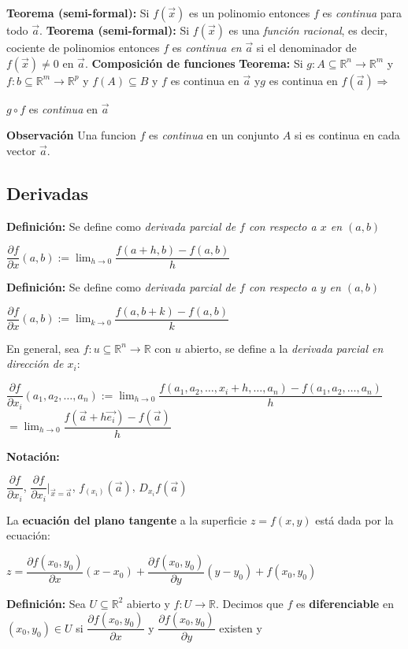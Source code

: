 \documentclass[12pt]{article}
\begin{document}
\noindent\textbf{Teorema (semi-formal):} Si $f(\vec{x})$ es un polinomio entonces $f$ es \emph{continua } para todo $\vec{a}$.\newline
\newline
\noindent\textbf{Teorema (semi-formal):} Si $f(\vec{x})$ es una \emph{función racional}, es decir, cociente de polinomios
entonces $f$ es \emph{continua en} $\vec{a}$ si el denominador de $f(\vec{x})\not=0$ en $\vec{a}$.\newline
\newline
\newpage
\textbf{Composición de funciones}\newline
\textbf{Teorema: }Si $g:A\subseteq\mathbb{R}^n\rightarrow \mathbb{R}^m$ y $f:b\subseteq\mathbb{R}^m\rightarrow \mathbb{R}^p$ y 
$f(A)\subseteq B$ y $f$ es continua en $\vec{a}$ y$g$ es continua en $f(\vec{a})\Longrightarrow$ 
\begin{center}
    $g\circ f$ es \emph{continua} en $\vec{a}$
\end{center}
\noindent \textbf{Observación} Una funcion $f$ es \emph{continua} en un conjunto $A$ si es continua en cada vector $\vec{a}$.
\newpage
\subsection*{Derivadas}
\noindent \textbf{Definición:} Se define como \emph{derivada parcial de $f$ con respecto a $x$ en $(a,b)$}
\begin{center}
    $\dfrac{\partial f}{\partial x}{(a,b)}:=\lim_{h\rightarrow0}{\dfrac{f(a+h,b)-f(a,b)}{h}}$
\end{center}
\noindent \textbf{Definición:} Se define como \emph{derivada parcial de $f$ con respecto a $y$ en $(a,b)$}
\begin{center}
    $\dfrac{\partial f}{\partial x}{(a,b)}:=\lim_{k\rightarrow0}{\dfrac{f(a,b+k)-f(a,b)}{k}}$
\end{center}
\noindent En general, sea $f:u\subseteq\mathbb{R}^n\rightarrow \mathbb{R}$ con $u$ abierto, 
se define a la \emph{derivada parcial en dirección de $x_i$}: 
\begin{center}
    $\dfrac{\partial f}{\partial x_i}{(a_1,a_2,\dots,a_n)}:=\lim_{h\rightarrow0}{\dfrac{f(a_1,a_2,\dots,x_i+h ,\dots,a_n)-f(a_1,a_2,\dots,a_n)}{h}}$
    \indent $=\lim_{h\rightarrow0}{\dfrac{f(\vec{a}+h\vec{e_i})-f(\vec{a})}{h}}$
\end{center}
\noindent \textbf{Notación: }
\begin{center}
    $\dfrac{\partial f}{\partial x_i}$, $\dfrac{\partial f}{\partial x_i}|_{\vec{x}=\vec{a}}$, $f_{(x_i)}(\vec{a})$, $D_{x_i}f(\vec{a})$
\end{center}
\noindent La \textbf{ecuación del plano tangente} a la superficie $z=f(x,y)$ está dada por la ecuación:
\begin{center}
    $z=\dfrac{\partial f(x_0,y_0)}{\partial x}(x-x_0)+\dfrac{\partial f(x_0,y_0)}{\partial y}(y-y_0)+f(x_0,y_0)$
\end{center}
\noindent \textbf{Definición:} Sea $U\subseteq\mathbb{R}^2$ abierto y $f:U\rightarrow\mathbb{R}$. Decimos que $f$ es 
\textbf{diferenciable} en $(x_0,y_0)\in U$ si $\dfrac{\partial f(x_0,y_0)}{\partial x}$ y $\dfrac{\partial f(x_0,y_0)}{\partial y}$
existen y 
\end{document}
